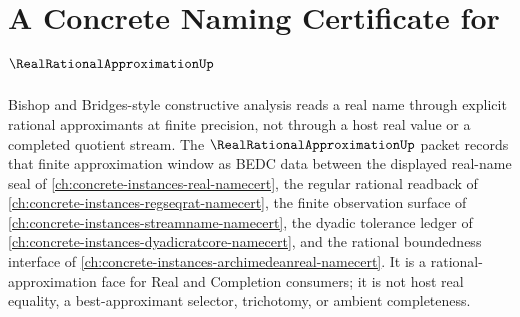 \chapter{A Concrete Naming Certificate for $\RealRationalApproximationUp$}
\label{ch:concrete-instances-real-rational-approximation-namecert}

Bishop and Bridges-style constructive analysis reads a real name through explicit rational approximants at finite precision, not through a host real value or a completed quotient stream. The $\RealRationalApproximationUp$ packet records that finite approximation window as BEDC data between the displayed real-name seal of \autoref{ch:concrete-instances-real-namecert}, the regular rational readback of \autoref{ch:concrete-instances-regseqrat-namecert}, the finite observation surface of \autoref{ch:concrete-instances-streamname-namecert}, the dyadic tolerance ledger of \autoref{ch:concrete-instances-dyadicratcore-namecert}, and the rational boundedness interface of \autoref{ch:concrete-instances-archimedeanreal-namecert}. It is a rational-approximation face for Real and Completion consumers; it is not host real equality, a best-approximant selector, trichotomy, or ambient completeness.

